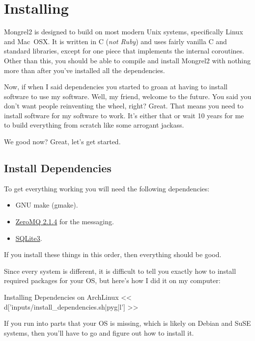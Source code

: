 \chapter{Installing}

Mongrel2 is designed to build on most modern Unix systems, specifically Linux
and Mac~OSX\@.  It is written in C (\emph{not Ruby}) and uses fairly vanilla
C and standard libraries, except for one piece that implements the internal
coroutines.  Other than this, you should be able to compile and install Mongrel2
with nothing more than  after you've installed
all the dependencies.

Now, if when I said dependencies you started to groan at having to install
software to use my software. Well, my friend, welcome to the future.  You
said you don't want people reinventing the wheel, right?  Great. That means
you need to install software for my software to work.  It's either that or
wait 10 years for me to build everything from scratch like some arrogant
jackass.

We good now?  Great, let's get started.

\section{Install Dependencies}

To get everything working you will need the following dependencies:

\begin{itemize}
\item GNU make (gmake).
\item \href{http://zeromq.org}{ZeroMQ 2.1.4} for the messaging.
\item \href{http://www.sqlite.org/}{SQLite3}.
\end{itemize}

If you install these things in this order, then everything should be good.

Since every system is different, it is difficult to tell you exactly how to
install required packages for your OS, but here's how I did it on my computer:

\begin{code}{Installing Dependencies on ArchLinux}
<< d['inputs/install_dependencies.sh|pyg|l'] >>
\end{code}

If you run into parts that your OS is missing, which is likely on
Debian and SuSE systems, then you'll have to go and figure out
how to install it.

